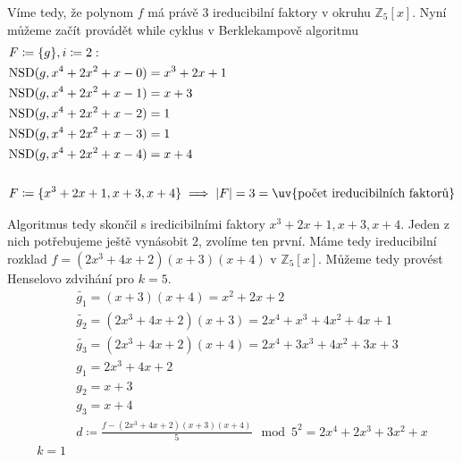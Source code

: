 \documentclass[12pt, a4paper]{article}
\begin{document}
Víme tedy, že polynom $f$ má právě 3 ireducibilní faktory v okruhu $\mathbb{Z}_5[x]$. Nyní můžeme začít provádět while cyklus v Berklekampově algoritmu
\begin{align*}
& F \coloneqq \{g\}, i \coloneqq 2: \\
& \text{NSD}(g, x^4+2x^2+x-0) = x^3+2x+1\\
& \text{NSD}(g, x^4+2x^2+x-1) = x+3\\
& \text{NSD}(g, x^4+2x^2+x-2) = 1\\
& \text{NSD}(g, x^4+2x^2+x-3) = 1\\
& \text{NSD}(g, x^4+2x^2+x-4) = x+4\\\\
& F \coloneqq \{x^3+2x+1, x+3, x+4\} \implies |F|=3=\text{\uv{počet ireducibilních faktorů}}
\end{align*}

Algoritmus tedy skončil s iredicibilními faktory $x^3+2x+1, x+3, x+4$. Jeden z nich potřebujeme ještě vynásobit $2$, zvolíme ten první. Máme tedy ireducibilní rozklad $f=(2x^3+4x+2)(x+3)(x+4)$ v $\mathbb{Z}_5[x]$. Můžeme tedy provést Henselovo zdvihání pro $k=5$.
\begin{align*}
&\tilde{g_1} = (x+3)(x+4)=x^2+2x+2\\
&\tilde{g_2} = (2x^3+4x+2)(x+3)=2x^4+x^3+4x^2+4x+1\\
&\tilde{g_3} = (2x^3+4x+2)(x+4)=2x^4+3x^3+4x^2+3x+3\\
&g_1 = 2x^3+4x+2\\
&g_2 = x+3\\
&g_3 = x+4\\
&d \coloneqq \frac{f-(2x^3+4x+2)(x+3)(x+4)}{5} \mod 5^2 = 2x^4+2x^3+3x^2+x\\
k=1
\end{align*}
\end{document}
